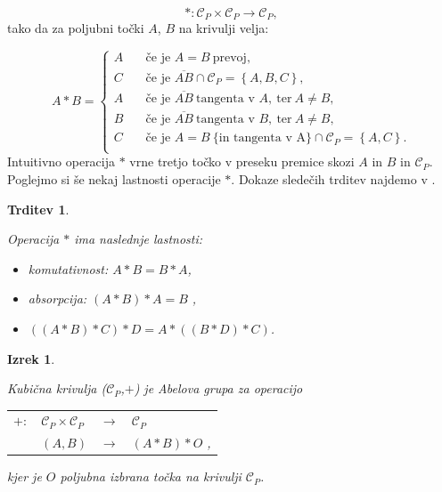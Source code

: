 \documentclass[12pt,a4paper,twoside]{article}
\theoremstyle{definition} %
\theoremstyle{plain} %
\newtheorem{izrek}[definicija]{Izrek}
\newtheorem{trditev}[definicija]{Trditev}
\numberwithin{equation}{section}  %
\begin{document}
$$\ast : \mathcal{C}_P \times \mathcal{C}_P \rightarrow \mathcal{C}_P,$$
tako da za poljubni točki $A$, $B$ na krivulji velja:

\[ A \ast B =
\begin{cases}
A & \quad \text{če je } A=B \ \text{prevoj},\\
C & \quad \text{če je } \overline{AB} \cap \mathcal{C}_P = \left\{ A,B,C \right\},\\
A & \quad \text{če je } \overline{AB} \ \text{tangenta v } A,\ \text{ter} \ A \neq B,\\
B & \quad \text{če je } \overline{AB} \ \text{tangenta v } B,\ \text{ter} \ A \neq B,\\
C &\quad \text{če je } A=B \ \{\text{in tangenta v A}\} \cap \mathcal{C}_P = \left\{ A,C \right\}.\\
\end{cases}
\]
Intuitivno operacija $\ast$ vrne tretjo točko v preseku premice skozi $A$ in $B$ in $\mathcal{C}_P$. Poglejmo si še nekaj lastnosti operacije $\ast$. Dokaze sledečih trditev najdemo v \cite[Poglavje 17.3]{gibson}.

\begin{trditev}~

\label{last zvezda}
Operacija $\ast$ ima naslednje lastnosti:

\begin{itemize}
\item komutativnost: $ A \ast B = B \ast A$,
\item absorpcija: $(A \ast B ) \ast A = B$ ,
\item $((A \ast B) \ast C ) \ast D = A \ast ((B \ast D)\ast C)$.
\end{itemize}
\end{trditev}

\begin{izrek}~

Kubična krivulja ($\mathcal{C}_P$,$+$) je Abelova grupa za operacijo

\begin{table}[ht]
\centering
\begin{tabular}{llll}
$+:$ & $\mathcal{C}_P \times \mathcal{C}_P$ & $\rightarrow$ & $\mathcal{C}_P$ \\
& $(A,B)$ & $\rightarrow$ & $(A\ast B)\ast O$ ,
\end{tabular}
\end{table}
kjer je $O$ poljubna izbrana točka na krivulji $ \mathcal{C}_P$.
\end{izrek}
\end{document}
